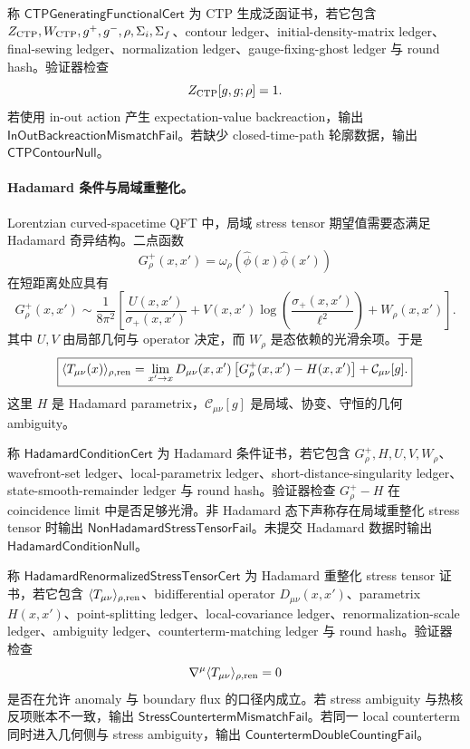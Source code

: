 \begin{definition}\label{def:typed-address-biaxial-completion-ctp-generating-functional-cert}
称 \(\mathsf{CTPGeneratingFunctionalCert}\) 为 CTP 生成泛函证书，若它包含 \(Z_{\rm CTP},W_{\rm CTP},g^+,g^-,\rho,\Sigma_i,\Sigma_f\)、contour ledger、initial-density-matrix ledger、final-sewing ledger、normalization ledger、gauge-fixing-ghost ledger 与 round hash。验证器检查
\[
Z_{\rm CTP}[g,g;\rho]=1.
\]
若使用 in-out action 产生 expectation-value backreaction，输出 \(\mathsf{InOutBackreactionMismatchFail}\)。若缺少 closed-time-path 轮廓数据，输出 \(\mathsf{CTPContourNull}\)。
\end{definition}

\paragraph{Hadamard 条件与局域重整化。}
Lorentzian curved-spacetime QFT 中，局域 stress tensor 期望值需要态满足 Hadamard 奇异结构。二点函数
\[
G^+_\rho(x,x')
=
\omega_\rho(\widehat\phi(x)\widehat\phi(x'))
\]
在短距离处应具有
\[
G^+_\rho(x,x')
\sim
\frac{1}{8\pi^2}
\left[
\frac{U(x,x')}{\sigma_+(x,x')}
+V(x,x')\log\!\left(\frac{\sigma_+(x,x')}{\ell^2}\right)
+W_\rho(x,x')
\right].
\]
其中 \(U,V\) 由局部几何与 operator 决定，而 \(W_\rho\) 是态依赖的光滑余项。于是
\[
\boxed{
\langle T_{\mu\nu}(x)\rangle_{\rho,{\rm ren}}
=
\lim_{x'\to x}
D_{\mu\nu}(x,x')
\left[
G^+_\rho(x,x')-H(x,x')
\right]
+\mathcal C_{\mu\nu}[g].
}
\]
这里 \(H\) 是 Hadamard parametrix，\(\mathcal C_{\mu\nu}[g]\) 是局域、协变、守恒的几何 ambiguity。

\begin{definition}\label{def:typed-address-biaxial-completion-hadamard-condition-cert}
称 \(\mathsf{HadamardConditionCert}\) 为 Hadamard 条件证书，若它包含 \(G^+_\rho,H,U,V,W_\rho\)、wavefront-set ledger、local-parametrix ledger、short-distance-singularity ledger、state-smooth-remainder ledger 与 round hash。验证器检查 \(G^+_\rho-H\) 在 coincidence limit 中是否足够光滑。非 Hadamard 态下声称存在局域重整化 stress tensor 时输出 \(\mathsf{NonHadamardStressTensorFail}\)。未提交 Hadamard 数据时输出 \(\mathsf{HadamardConditionNull}\)。
\end{definition}

\begin{definition}\label{def:typed-address-biaxial-completion-hadamard-renormalized-stress-tensor-cert}
称 \(\mathsf{HadamardRenormalizedStressTensorCert}\) 为 Hadamard 重整化 stress tensor 证书，若它包含 \(\langle T_{\mu\nu}\rangle_{\rho,{\rm ren}}\)、bidifferential operator \(D_{\mu\nu}(x,x')\)、parametrix \(H(x,x')\)、point-splitting ledger、local-covariance ledger、renormalization-scale ledger、ambiguity ledger、counterterm-matching ledger 与 round hash。验证器检查
\[
\nabla^\mu\langle T_{\mu\nu}\rangle_{\rho,{\rm ren}}=0
\]
是否在允许 anomaly 与 boundary flux 的口径内成立。若 stress ambiguity 与热核反项账本不一致，输出 \(\mathsf{StressCountertermMismatchFail}\)。若同一 local counterterm 同时进入几何侧与 stress ambiguity，输出 \(\mathsf{CountertermDoubleCountingFail}\)。
\end{definition}

